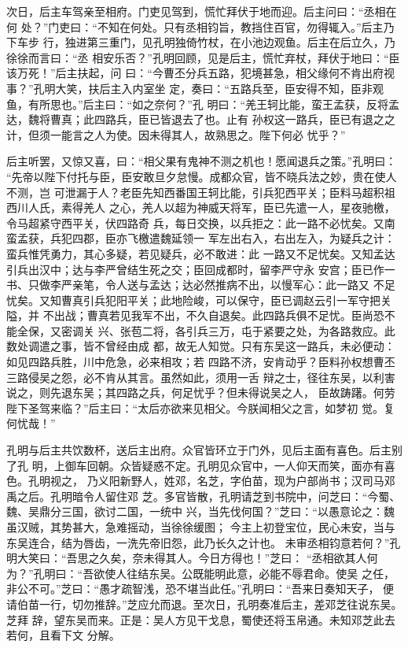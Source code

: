 次日，后主车驾亲至相府。门吏见驾到，慌忙拜伏于地而迎。后主问曰：“丞相在何
处？”门吏曰：“不知在何处。只有丞相钧旨，教挡住百官，勿得辄入。”后主乃下车步
行，独进第三重门，见孔明独倚竹杖，在小池边观鱼。后主在后立久，乃徐徐而言曰：“丞
相安乐否？”孔明回顾，见是后主，慌忙弃杖，拜伏于地曰：“臣该万死！”后主扶起，问
曰：“今曹丕分兵五路，犯境甚急，相父缘何不肯出府视事？”孔明大笑，扶后主入内室坐
定，奏曰：“五路兵至，臣安得不知，臣非观鱼，有所思也。”后主曰：“如之奈何？”孔
明曰：“羌王轲比能，蛮王孟获，反将孟达，魏将曹真；此四路兵，臣已皆退去了也。止有
孙权这一路兵，臣已有退之之计，但须一能言之人为使。因未得其人，故熟思之。陛下何必
忧乎？”

后主听罢，又惊又喜，曰：“相父果有鬼神不测之机也！愿闻退兵之策。”孔明曰：
“先帝以陛下付托与臣，臣安敢旦夕怠慢。成都众官，皆不晓兵法之妙，贵在使人不测，岂
可泄漏于人？老臣先知西番国王轲比能，引兵犯西平关；臣料马超积祖西川人氏，素得羌人
之心，羌人以超为神威天将军，臣已先遣一人，星夜驰檄，令马超紧守西平关，伏四路奇
兵，每日交换，以兵拒之：此一路不必忧矣。又南蛮孟获，兵犯四郡，臣亦飞檄遣魏延领一
军左出右入，右出左入，为疑兵之计：蛮兵惟凭勇力，其心多疑，若见疑兵，必不敢进：此
一路又不足忧矣。又知孟达引兵出汉中；达与李严曾结生死之交；臣回成都时，留李严守永
安宫；臣已作一书、只做李严亲笔，令人送与孟达；达必然推病不出，以慢军心：此一路又
不足忧矣。又知曹真引兵犯阳平关；此地险峻，可以保守，臣已调赵云引一军守把关隘，并
不出战；曹真若见我军不出，不久自退矣。此四路兵俱不足忧。臣尚恐不能全保，又密调关
兴、张苞二将，各引兵三万，屯于紧要之处，为各路救应。此数处调遣之事，皆不曾经由成
都，故无人知觉。只有东吴这一路兵，未必便动：如见四路兵胜，川中危急，必来相攻；若
四路不济，安肯动乎？臣料孙权想曹丕三路侵吴之怨，必不肯从其言。虽然如此，须用一舌
辩之士，径往东吴，以利害说之，则先退东吴；其四路之兵，何足忧乎？但未得说吴之人，
臣故踌躇。何劳陛下圣驾来临？”后主曰：“太后亦欲来见相父。今朕闻相父之言，如梦初
觉。复何忧哉！”

孔明与后主共饮数杯，送后主出府。众官皆环立于门外，见后主面有喜色。后主别了孔
明，上御车回朝。众皆疑惑不定。孔明见众官中，一人仰天而笑，面亦有喜色。孔明视之，
乃义阳新野人，姓邓，名芝，字伯苗，现为户部尚书；汉司马邓禹之后。孔明暗令人留住邓
芝。多官皆散，孔明请芝到书院中，问芝曰：“今蜀、魏、吴鼎分三国，欲讨二国，一统中
兴，当先伐何国？”芝曰：“以愚意论之：魏虽汉贼，其势甚大，急难摇动，当徐徐缓图；
今主上初登宝位，民心未安，当与东吴连合，结为唇齿，一洗先帝旧怨，此乃长久之计也。
未审丞相钧意若何？”孔明大笑曰：“吾思之久矣，奈未得其人。今日方得也！”芝曰：
“丞相欲其人何为？”孔明曰：“吾欲使人往结东吴。公既能明此意，必能不辱君命。使吴
之任，非公不可。”芝曰：“愚才疏智浅，恐不堪当此任。”孔明曰：“吾来日奏知天子，
便请伯苗一行，切勿推辞。”芝应允而退。至次日，孔明奏准后主，差邓芝往说东吴。芝拜
辞，望东吴而来。正是：吴人方见干戈息，蜀使还将玉帛通。未知邓芝此去若何，且看下文
分解。